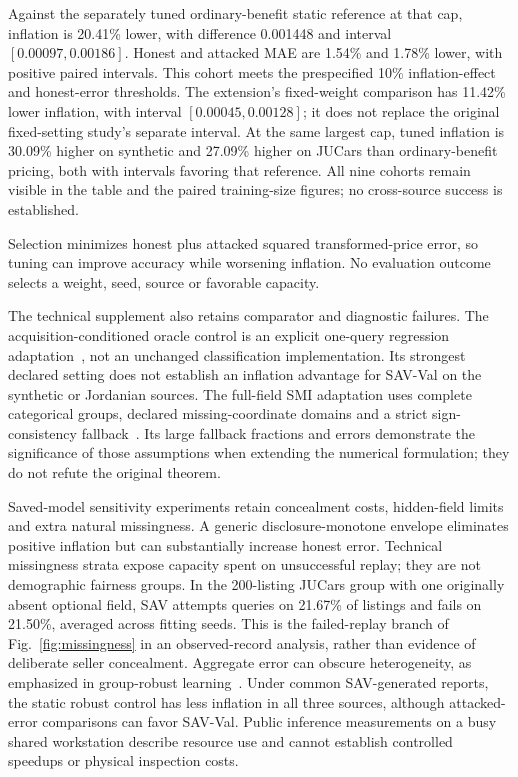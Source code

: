 Against the separately tuned ordinary-benefit static reference at that cap,
inflation is 20.41\% lower, with difference 0.001448 and interval
$[0.00097,0.00186]$. Honest and attacked MAE are 1.54\% and 1.78\% lower,
with positive paired intervals. This cohort meets the prespecified 10\%
inflation-effect and honest-error thresholds. The extension's fixed-weight
comparison has 11.42\% lower inflation, with interval $[0.00045,0.00128]$;
it does not replace the original fixed-setting study's separate interval.
At the same largest cap, tuned inflation is 30.09\% higher on synthetic and
27.09\% higher on JUCars than ordinary-benefit pricing, both with intervals
favoring that reference. All nine cohorts remain visible in the table and
the paired training-size figures; no cross-source success is established.

Selection minimizes honest plus attacked squared transformed-price error,
so tuning can improve accuracy while worsening inflation. No evaluation
outcome selects a weight, seed, source or favorable capacity.

The technical supplement also retains comparator and diagnostic failures.
The acquisition-conditioned oracle control is an explicit one-query regression
adaptation~\cite{valancius2024aco}, not an unchanged classification implementation.
Its strongest declared setting does not establish an inflation advantage for
SAV-Val on the synthetic or Jordanian sources. The full-field SMI adaptation
uses complete categorical groups, declared missing-coordinate domains and a
strict sign-consistency fallback~\cite{zhang2020strategic}. Its large fallback
fractions and errors demonstrate the significance of those assumptions when
extending the numerical formulation; they do not refute the original theorem.

Saved-model sensitivity experiments retain concealment costs, hidden-field
limits and extra natural missingness. A generic disclosure-monotone envelope
eliminates positive inflation but can substantially increase honest error.
Technical missingness strata expose capacity spent on unsuccessful replay;
they are not demographic fairness groups. In the 200-listing JUCars group
with one originally absent optional field, SAV attempts queries on 21.67\%
of listings and fails on 21.50\%, averaged across fitting seeds. This is the
failed-replay branch of Fig.~\ref{fig:missingness} in an observed-record
analysis, rather than evidence of deliberate seller concealment.
Aggregate error can obscure
heterogeneity, as emphasized in group-robust learning~\cite{sagawa2019groups}.
Under common SAV-generated reports,
the static robust control has less inflation in all three sources, although
attacked-error comparisons can favor SAV-Val. Public inference measurements
on a busy shared workstation describe resource use and cannot establish
controlled speedups or physical inspection costs.

